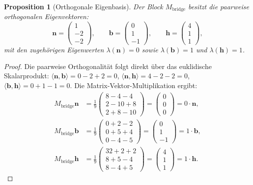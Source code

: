 \documentclass[11pt,a4paper]{article}
\theoremstyle{plain}
\newtheorem{proposition}[theorem]{Proposition}
\theoremstyle{definition}
\begin{document}
\begin{proposition}[Orthogonale Eigenbasis]
Der Block $M_{\mathrm{bridge}}$ besitzt die paarweise orthogonalen Eigenvektoren:
\begin{equation}
    \mathbf{n} = \begin{pmatrix} 1 \\ -2 \\ -2 \end{pmatrix}, \qquad \mathbf{b} = \begin{pmatrix} 0 \\ 1 \\ -1 \end{pmatrix}, \qquad \mathbf{h} = \begin{pmatrix} 4 \\ 1 \\ 1 \end{pmatrix},
\end{equation}
mit den zugehörigen Eigenwerten $\lambda(\mathbf{n}) = 0$ sowie $\lambda(\mathbf{b}) = 1$ und $\lambda(\mathbf{h}) = 1$.
\end{proposition}

\begin{proof}
Die paarweise Orthogonalität folgt direkt über das euklidische Skalarprodukt:
$\langle \mathbf{n}, \mathbf{b} \rangle = 0 - 2 + 2 = 0$, $\langle \mathbf{n}, \mathbf{h} \rangle = 4 - 2 - 2 = 0$, $\langle \mathbf{b}, \mathbf{h} \rangle = 0 + 1 - 1 = 0$. 
Die Matrix-Vektor-Multiplikation ergibt:
\begin{align}
    M_{\mathrm{bridge}} \mathbf{n} &= \frac{1}{9} \begin{pmatrix} 8-4-4 \\ 2-10+8 \\ 2+8-10 \end{pmatrix} = \begin{pmatrix} 0 \\ 0 \\ 0 \end{pmatrix} = 0 \cdot \mathbf{n}, \\
    M_{\mathrm{bridge}} \mathbf{b} &= \frac{1}{9} \begin{pmatrix} 0+2-2 \\ 0+5+4 \\ 0-4-5 \end{pmatrix} = \begin{pmatrix} 0 \\ 1 \\ -1 \end{pmatrix} = 1 \cdot \mathbf{b}, \\
    M_{\mathrm{bridge}} \mathbf{h} &= \frac{1}{9} \begin{pmatrix} 32+2+2 \\ 8+5-4 \\ 8-4+5 \end{pmatrix} = \begin{pmatrix} 4 \\ 1 \\ 1 \end{pmatrix} = 1 \cdot \mathbf{h}.
\end{align}
\end{proof}
\end{document}
